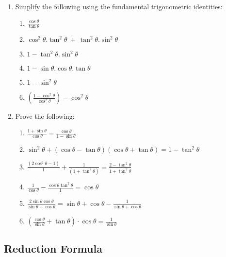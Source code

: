 {
\begin{enumerate}
	\item Simplify the following using the fundamental trigonometric identities:
	\begin{enumerate}
		\item $\frac{\cos\theta }{\tan\theta }$
		\item $\cos^2\theta.\tan^2\theta\ +\ \tan^2\theta.\sin^2\theta$
		\item $1 - \tan^2\theta.\sin^2\theta$
		\item $1 - \sin\theta.\cos\theta.\tan\theta $
		\item $1-\sin^2\theta $
		\item $\left(\frac{1 - \cos^2\theta }{\cos^2\theta }\right) - \cos^2\theta$
	\end{enumerate}
	\item Prove the following:
	\begin{enumerate}
		\item $\frac{1 + \sin\theta}{\cos\theta} = \frac{\cos\theta}{1 - \sin\theta}$
		\item $\sin^2\theta + (\cos\theta - \tan\theta)(\cos\theta + \tan\theta)  = 1 - \tan^2\theta$
		\item $\frac{(2\cos^2\theta - 1)}{1} + \frac{1}{(1 + \tan^2\theta)} = \frac{2 - \tan^2\theta}{1 + \tan^2\theta}$
		\item $\frac{1}{\cos\theta} - \frac{\cos\theta\tan^2\theta}{1} = \cos\theta$
		\item $\frac{2\sin\theta\cos\theta}{\sin\theta+\cos\theta} = \sin\theta+\cos\theta - \frac{1}{\sin\theta+\cos\theta}$
		\item $\left(\frac{\cos\theta}{\sin\theta} + \tan\theta \right)\cdot\cos\theta = \frac{1}{\sin\theta}$
	\end{enumerate}
\end{enumerate}


\practiceinfo}%


\subsection{Reduction Formula}

